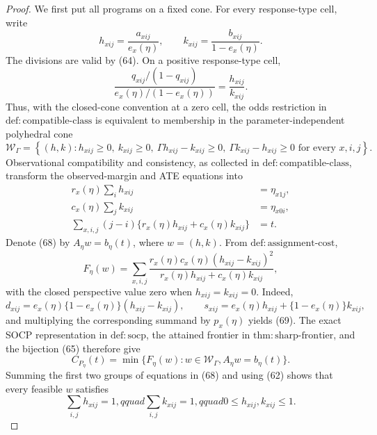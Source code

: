\documentclass{article}
\begin{document}
\begin{proof}
We first put all programs on a fixed cone.  For every response-type cell, write
\[
h_{xij}=\frac{a_{xij}}{e_x(\eta)},
\qquad
k_{xij}=\frac{b_{xij}}{1-e_x(\eta)}.
\tag{65}
\]
The divisions are valid by (64).  On a positive response-type cell,
\[
\frac{q_{xij}/(1-q_{xij})}{e_x(\eta)/(1-e_x(\eta))}
=\frac{h_{xij}}{k_{xij}}.
\tag{66}
\]
Thus, with the closed-cone convention at a zero cell, the odds restriction in \(\mathrm{def{:}compatible\mbox{-}class}\) is equivalent to membership in the parameter-independent polyhedral cone
\[
\mathcal W_\Gamma
=\left\{(h,k):
h_{xij}\geq0,\ k_{xij}\geq0,\
\Gamma h_{xij}-k_{xij}\geq0,\
\Gamma k_{xij}-h_{xij}\geq0
\text{ for every }x,i,j\right\}.
\tag{67}
\]
Observational compatibility and consistency, as collected in \(\mathrm{def{:}compatible\mbox{-}class}\), transform the observed-margin and ATE equations into
\[
\begin{aligned}
r_x(\eta)\sum_i h_{xij}&=\eta_{x1j},\\
c_x(\eta)\sum_j k_{xij}&=\eta_{x0i},\\
\sum_{x,i,j}(j-i)
\{r_x(\eta)h_{xij}+c_x(\eta)k_{xij}\}&=t.
\end{aligned}
\tag{68}
\]
Denote (68) by \(A_\eta w=b_\eta(t)\), where \(w=(h,k)\).  From \(\mathrm{def{:}assignment\mbox{-}cost}\),
\[
F_\eta(w)
=\sum_{x,i,j}
\frac{r_x(\eta)c_x(\eta)(h_{xij}-k_{xij})^2}
{r_x(\eta)h_{xij}+c_x(\eta)k_{xij}},
\tag{69}
\]
with the closed perspective value zero when \(h_{xij}=k_{xij}=0\).  Indeed,
\[
d_{xij}=e_x(\eta)\{1-e_x(\eta)\}(h_{xij}-k_{xij}),
\qquad
s_{xij}=e_x(\eta)h_{xij}+\{1-e_x(\eta)\}k_{xij},
\tag{70}
\]
and multiplying the corresponding summand by \(p_x(\eta)\) yields (69).  The exact SOCP representation in \(\mathrm{def{:}socp}\), the attained frontier in \(\mathrm{thm{:}sharp\mbox{-}frontier}\), and the bijection (65) therefore give
\[
C_{P_\eta}(t)
=\min\{F_\eta(w):w\in\mathcal W_\Gamma, A_\eta w=b_\eta(t)\}.
\tag{71}
\]
Summing the first two groups of equations in (68) and using (62) shows that every feasible \(w\) satisfies
\[
\sum_{i,j}h_{xij}=1,qquad
\sum_{i,j}k_{xij}=1,qquad
0\leq h_{xij},k_{xij}\leq1.
\tag{72}
\]


\end{proof}
\end{document}
